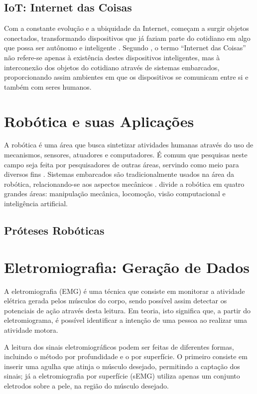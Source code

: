 \subsection{IoT: Internet das Coisas}
Com a constante evolução e a ubiquidade da Internet, começam a surgir objetos conectados, transformando dispositivos que já faziam parte do cotidiano em algo que possa ser autônomo e inteligente \cite{kopetz:2011}.  Segundo , o termo ``Internet das Coisas''  não refere-se apenas à existência destes dispositivos inteligentes, mas à interconexão dos objetos do cotidiano através de sistemas embarcados, proporcionando assim ambientes em que os dispositivos se comunicam entre si e também com seres humanos.

\section{Robótica e suas Aplicações}
A robótica é uma área que busca sintetizar atividades humanas através do uso de mecanismos, sensores, atuadores e computadores. É comum que pesquisas neste campo seja feita por pesquisadores de outras áreas, servindo como meio para diversos fins \cite{craig:2005}. Sistemas embarcados são tradicionalmente usados na área da robótica, relacionando-se aos aspectos mecânicos \cite{marwedel:2010}.  divide a robótica em quatro grandes áreas: manipulação mecânica, locomoção, visão computacional e inteligência artificial.
\label{sec:robotica}
\subsection{Próteses Robóticas}

\section{Eletromiografia: Geração de Dados}
\label{sec:emg}
A eletromiografia (EMG) é uma técnica que consiste em monitorar a atividade elétrica gerada pelos músculos do corpo, sendo possível assim detectar os potenciais de ação através desta leitura. Em teoria, isto significa que, a partir do eletromiograma, é possível identificar a intenção de uma pessoa ao realizar uma atividade motora.

A leitura dos sinais eletromiográficos podem ser feitas de diferentes formas, incluindo o método por profundidade e o por superfície. O primeiro consiste em inserir uma agulha que atinja o músculo desejado, permitindo a captação dos sinais; já a eletromiografia por superfície (sEMG) utiliza apenas um conjunto eletrodos sobre a pele, na região do músculo desejado.

